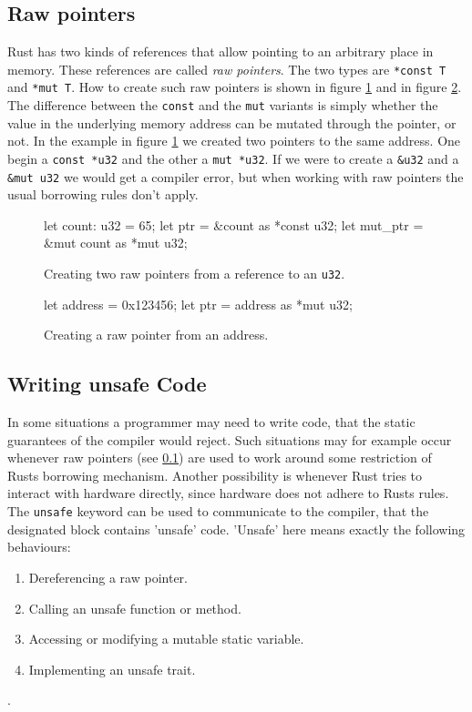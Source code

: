 \documentclass[twocolumn]{article}
\begin{document}
\subsection{Raw pointers}
\label{raw-pointer}
Rust has two kinds of references that allow pointing to an arbitrary place in memory.
These references are called \textit{raw pointers}. 
The two types are \texttt{*const T} and \texttt{*mut T}.
How to create such raw pointers is shown in figure \ref{raw-pointer-new} and in figure \ref{raw-pointer-new2}.
The difference between the \texttt{const} and the \texttt{mut} variants is simply whether the value in the underlying memory address can be mutated through the pointer, or not.
In the example in figure \ref{raw-pointer-new} we created two pointers to the same address.
One begin a \texttt{const *u32} and the other a \texttt{mut *u32}.
If we were to create a \texttt{&u32} and a \texttt{&mut u32} we would get a compiler error, but when working with raw pointers the usual borrowing rules don't apply.
\begin{figure}
\begin{rustcode}
let count: u32 = 65;
let ptr = &count as *const u32;
let mut_ptr = &mut count as *mut u32;
\end{rustcode}
\vspace{-2em}
\caption{Creating two raw pointers from a reference to an \texttt{u32}.}
\label{raw-pointer-new}
\end{figure}
\begin{figure}
\begin{rustcode}
let address = 0x123456;
let ptr = address as *mut u32;
\end{rustcode}
\vspace{-2em}
\caption{Creating a raw pointer from an address.}
\label{raw-pointer-new2}
\end{figure}
\subsection{Writing unsafe Code}
\label{unsafe}
In some situations a programmer may need to write code, that the static guarantees of the compiler would reject.
Such situations may for example occur whenever raw pointers (see \ref{raw-pointer}) are used to work around some restriction of Rusts borrowing mechanism.
Another possibility is whenever Rust tries to interact with hardware directly, since hardware does not adhere to Rusts rules.
The \texttt{unsafe} keyword can be used to communicate to the compiler, that the designated block contains 'unsafe' code.
'Unsafe' here means exactly the following behaviours:
\begin{enumerate}
        \item Dereferencing a raw pointer.
        \item Calling an unsafe function or method.
        \item Accessing or modifying a mutable static variable.
        \item Implementing an unsafe trait.
\end{enumerate}
\cite{RustBook-Unsafe}.
\end{document}
